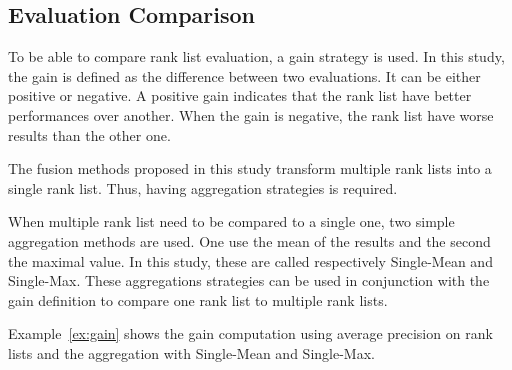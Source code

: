 \subsection{Evaluation Comparison~\label{sec:evaluation_comparison}}

To be able to compare rank list evaluation, a gain strategy is used.
In this study, the gain is defined as the difference between two evaluations.
It can be either positive or negative.
A positive gain indicates that the rank list have better performances over another.
When the gain is negative, the rank list have worse results than the other one.

The fusion methods proposed in this study transform multiple rank lists into a single rank list.
Thus, having aggregation strategies is required.

When multiple rank list need to be compared to a single one, two simple aggregation methods are used.
One use the mean of the results and the second the maximal value.
In this study, these are called respectively Single-Mean and Single-Max.
These aggregations strategies can be used in conjunction with the gain definition to compare one rank list to multiple rank lists.

Example~\ref{ex:gain} shows the gain computation using average precision on rank lists and the aggregation with Single-Mean and Single-Max.

